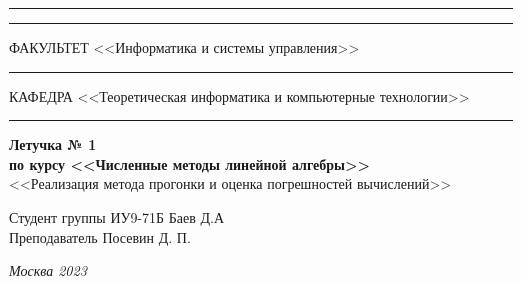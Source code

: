 \documentclass[a4paper, 14pt]{extarticle}
\begin{document}
\begin{titlepage}
\vspace{-25pt}
\hspace{-35pt}\rule{\textwidth}{2.3pt}

\vspace*{-20.3pt}
\hspace{-35pt}\rule{\textwidth}{0.4pt}

\vspace{1.5ex}
\hspace{-35pt} \noindent \small ФАКУЛЬТЕТ\hspace{80pt} <<Информатика и системы управления>>

\vspace*{-16pt}
\hspace{47pt}\rule{0.83\textwidth}{0.4pt}

\vspace{0.5ex}
\hspace{-35pt} \noindent \small КАФЕДРА\hspace{50pt} <<Теоретическая информатика и компьютерные технологии>>

\vspace*{-16pt}
\hspace{30pt}\rule{0.866\textwidth}{0.4pt}

\vspace{11em}

\begin{center}
\Large {\bf Летучка № 1 } \\
\large {\bf по курсу <<Численные методы линейной алгебры>>} \\
\large <<Реализация метода прогонки и оценка погрешностей
вычислений>>
\end{center}\normalsize

\vspace{8em}


\begin{flushright}
  {Студент группы ИУ9-71Б Баев Д.А \hspace*{15pt}\\
  \vspace{2ex}
  Преподаватель Посевин Д. П.\hspace*{15pt}}
\end{flushright}

\bigskip

\vfill


\begin{center}
\textsl{Москва 2023}
\end{center}
\end{titlepage}
\end{document}
